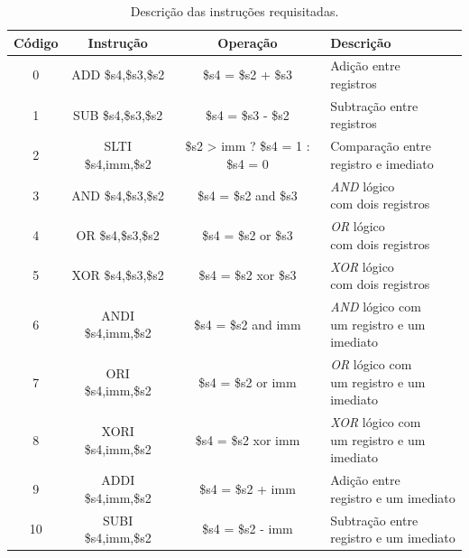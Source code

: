 \documentclass[11pt,a4paper,titlepage]{article}
\begin{document}
\begin{table}[h]
\centering
\begin{tabular}{| c | c | c | l |}
\hline
Código & Instrução & Operação & Descrição\\
\hline
0 & ADD \$s4,\$s3,\$s2 & \$s4 = \$s2 + \$s3 & \makecell{Adição entre \\ registros}\\
\hline
1 & SUB \$s4,\$s3,\$s2 & \$s4 = \$s3 - \$s2 & \makecell{Subtração entre \\ registros} \\
\hline
2 & SLTI \$s4,imm,\$s2 & \$s2 > imm ? \$s4 = 1 : \$s4 = 0 & \makecell{Comparação entre \\ registro e imediato }\\
\hline
3 & AND \$s4,\$s3,\$s2 & \$s4 = \$s2 and \$s3 & \makecell{\textit{AND} lógico \\ com dois registros}\\
\hline
4 & OR \$s4,\$s3,\$s2 &  \$s4 = \$s2 or \$s3 & \makecell{\textit{OR} lógico \\ com dois registros}\\
\hline
5 & XOR \$s4,\$s3,\$s2 &  \$s4 = \$s2 xor \$s3 & \makecell{\textit{XOR} lógico \\ com dois registros}\\
\hline
6 & ANDI \$s4,imm,\$s2 & \$s4 = \$s2 and imm & \makecell{\textit{AND} lógico com \\ um registro e um imediato}\\
\hline
7 & ORI \$s4,imm,\$s2 & \$s4 = \$s2 or imm & \makecell{\textit{OR} lógico com \\ um registro e um imediato} \\
\hline
8 & XORI \$s4,imm,\$s2 & \$s4 = \$s2 xor imm & \makecell{\textit{XOR} lógico com \\ um registro e um imediato} \\
\hline
9 & ADDI \$s4,imm,\$s2 & \$s4 = \$s2 + imm & \makecell{Adição entre \\ registro e um imediato}\\
\hline
10 & SUBI \$s4,imm,\$s2 & \$s4 = \$s2 - imm & \makecell{Subtração entre \\ registro e um imediato}\\
\hline
\end{tabular}
\caption{Descrição das instruções requisitadas.}
\label{tab:ULA}
\end{table}
\end{document}
